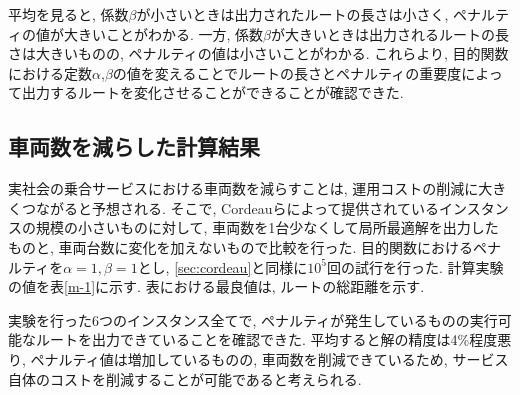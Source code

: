 平均を見ると, 係数$\beta$が小さいときは出力されたルートの長さは小さく, ペナルティの値が大きいことがわかる. 一方, 係数$\beta$が大きいときは出力されるルートの長さは大きいものの, ペナルティの値は小さいことがわかる. これらより, 目的関数における定数$\alpha$,$\beta$の値を変えることでルートの長さとペナルティの重要度によって出力するルートを変化させることができることが確認できた.

\subsection{車両数を減らした計算結果}
実社会の乗合サービスにおける車両数を減らすことは, 運用コストの削減に大きくつながると予想される. そこで, Cordeauらによって提供されているインスタンスの規模の小さいものに対して, 車両数を1台少なくして局所最適解を出力したものと, 車両台数に変化を加えないもので比較を行った. 目的関数におけるペナルティを$\alpha=1,\beta=1$とし, \ref{sec:cordeau}と同様に$10^5$回の試行を行った. 計算実験の値を表\ref{m-1}に示す. 表における最良値は, ルートの総距離を示す.

実験を行った6つのインスタンス全てで, ペナルティが発生しているものの実行可能なルートを出力できていることを確認できた. 平均すると解の精度は4\%程度悪り, ペナルティ値は増加しているものの, 車両数を削減できているため, サービス自体のコストを削減することが可能であると考えられる.




